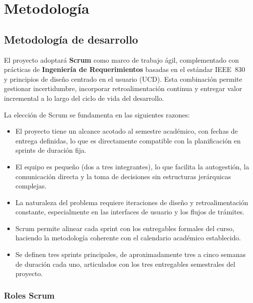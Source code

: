\section{Metodología}

\subsection{Metodología de desarrollo}

El proyecto adoptará \textbf{Scrum} como marco de trabajo ágil, complementado con
prácticas de \textbf{Ingeniería de Requerimientos} basadas en el estándar IEEE~830
y principios de diseño centrado en el usuario (UCD). Esta combinación permite
gestionar incertidumbre, incorporar retroalimentación continua y entregar valor
incremental a lo largo del ciclo de vida del desarrollo.

La elección de Scrum se fundamenta en las siguientes razones:

\begin{itemize}
      \item El proyecto tiene un alcance acotado al semestre académico, con fechas de entrega
      definidas, lo que es directamente compatible con la planificación en sprints de
      duración fija.
      \item El equipo es pequeño (dos a tres integrantes), lo que facilita la autogestión, la
      comunicación directa y la toma de decisiones sin estructuras jerárquicas complejas.
      \item La naturaleza del problema requiere iteraciones de diseño y retroalimentación
      constante, especialmente en las interfaces de usuario y los flujos de trámites.
      \item Scrum permite alinear cada sprint con los entregables formales del curso, haciendo
      la metodología coherente con el calendario académico establecido.
      \item Se definen tres sprints principales, de aproximadamente tres a cinco semanas de
      duración cada uno, articulados con los tres entregables semestrales del proyecto.
\end{itemize}

\subsubsection{Roles Scrum}

